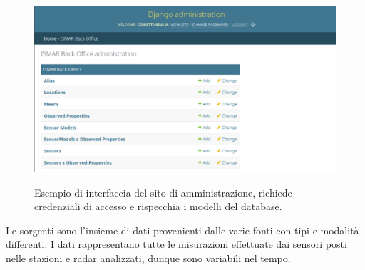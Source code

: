 \documentclass[./main.tex]{subfiles}
\begin{document}
\begin{figure}[!ht]
\noindent\begin{minipage}{0.5\textwidth}
\vspace{1cm}
\includegraphics[width=\textwidth]{images/sample_backoffice.pdf}
\captionsetup{font=small, hypcap=false}
\label{fig:bo}
\end{minipage}
\hspace{0.05\textwidth}
\begin{minipage}{0.4\textwidth}
\begin{small}
Esempio di interfaccia del sito di amministrazione, richiede credenziali di accesso e rispecchia i modelli del database.
\end{small}
\end{minipage}
\vspace{0.25cm}
\end{figure}

Le sorgenti sono l'insieme di dati provenienti dalle varie fonti con tipi e modalità differenti. I dati rappresentano tutte le misurazioni effettuate dai sensori posti nelle stazioni e radar analizzati, dunque sono variabili nel tempo.\par
\end{document}
